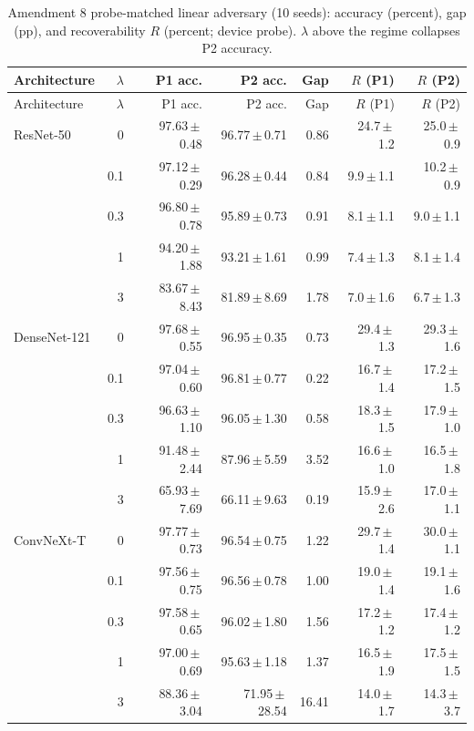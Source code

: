 {\footnotesize
\setlength{\tabcolsep}{3.5pt}
\begin{longtable}{lrrrrrr}
\caption{Amendment 8 probe-matched linear adversary (10 seeds): accuracy (percent), gap (pp), and recoverability $R$ (percent; device probe). $\lambda$ above the regime collapses P2 accuracy.}\label{r:tab:linadv}\\
\toprule
Architecture & $\lambda$ & P1 acc. & P2 acc. & Gap & $R$ (P1) & $R$ (P2) \\
\midrule
\endfirsthead
\toprule
Architecture & $\lambda$ & P1 acc. & P2 acc. & Gap & $R$ (P1) & $R$ (P2) \\
\midrule
\endhead
\bottomrule
\endfoot
ResNet-50 & 0 & 97.63\,$\pm$\,0.48 & 96.77\,$\pm$\,0.71 & 0.86 & 24.7\,$\pm$\,1.2 & 25.0\,$\pm$\,0.9 \\
 & 0.1 & 97.12\,$\pm$\,0.29 & 96.28\,$\pm$\,0.44 & 0.84 & 9.9\,$\pm$\,1.1 & 10.2\,$\pm$\,0.9 \\
 & 0.3 & 96.80\,$\pm$\,0.78 & 95.89\,$\pm$\,0.73 & 0.91 & 8.1\,$\pm$\,1.1 & 9.0\,$\pm$\,1.1 \\
 & 1 & 94.20\,$\pm$\,1.88 & 93.21\,$\pm$\,1.61 & 0.99 & 7.4\,$\pm$\,1.3 & 8.1\,$\pm$\,1.4 \\
 & 3 & 83.67\,$\pm$\,8.43 & 81.89\,$\pm$\,8.69 & 1.78 & 7.0\,$\pm$\,1.6 & 6.7\,$\pm$\,1.3 \\
DenseNet-121 & 0 & 97.68\,$\pm$\,0.55 & 96.95\,$\pm$\,0.35 & 0.73 & 29.4\,$\pm$\,1.3 & 29.3\,$\pm$\,1.6 \\
 & 0.1 & 97.04\,$\pm$\,0.60 & 96.81\,$\pm$\,0.77 & 0.22 & 16.7\,$\pm$\,1.4 & 17.2\,$\pm$\,1.5 \\
 & 0.3 & 96.63\,$\pm$\,1.10 & 96.05\,$\pm$\,1.30 & 0.58 & 18.3\,$\pm$\,1.5 & 17.9\,$\pm$\,1.0 \\
 & 1 & 91.48\,$\pm$\,2.44 & 87.96\,$\pm$\,5.59 & 3.52 & 16.6\,$\pm$\,1.0 & 16.5\,$\pm$\,1.8 \\
 & 3 & 65.93\,$\pm$\,7.69 & 66.11\,$\pm$\,9.63 & \textminus{}0.19 & 15.9\,$\pm$\,2.6 & 17.0\,$\pm$\,1.1 \\
ConvNeXt-T & 0 & 97.77\,$\pm$\,0.73 & 96.54\,$\pm$\,0.75 & 1.22 & 29.7\,$\pm$\,1.4 & 30.0\,$\pm$\,1.1 \\
 & 0.1 & 97.56\,$\pm$\,0.75 & 96.56\,$\pm$\,0.78 & 1.00 & 19.0\,$\pm$\,1.4 & 19.1\,$\pm$\,1.6 \\
 & 0.3 & 97.58\,$\pm$\,0.65 & 96.02\,$\pm$\,1.80 & 1.56 & 17.2\,$\pm$\,1.2 & 17.4\,$\pm$\,1.2 \\
 & 1 & 97.00\,$\pm$\,0.69 & 95.63\,$\pm$\,1.18 & 1.37 & 16.5\,$\pm$\,1.9 & 17.5\,$\pm$\,1.5 \\
 & 3 & 88.36\,$\pm$\,3.04 & 71.95\,$\pm$\,28.54 & 16.41 & 14.0\,$\pm$\,1.7 & 14.3\,$\pm$\,3.7 \\
\end{longtable}
}

